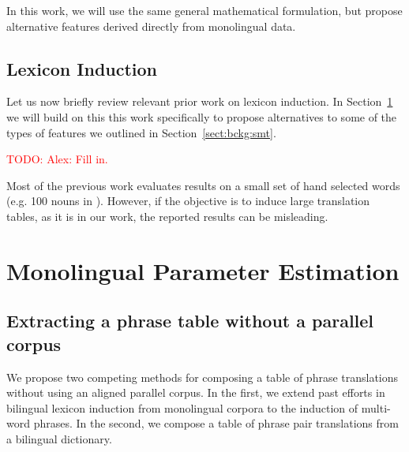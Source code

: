 \documentclass[11pt]{article}
\newcommand{\mnote}[1]{\marginpar{%
  \vskip-\baselineskip
  \raggedright\footnotesize
  \itshape\hrule\smallskip\tiny{#1}\par\smallskip\hrule}}
\newcommand{\mtodo}[1]{\mnote{\textcolor{red}{#1}}}
\newcommand{\todo}[1]{\textcolor{red}{TODO: #1}}
\newcommand{\secref}[1]{Section~\ref{#1}}
\begin{document}
In this work, we will use the same general mathematical formulation, but propose alternative features derived directly from monolingual data.

 \subsection{Lexicon Induction} \label{sect:bckg:lexind}
 
Let us now briefly review relevant prior work on lexicon induction.  In \secref{sect:mono} we will build on this this work specifically to propose alternatives to some of the types of features we outlined in \secref{sect:bckg:smt}.

\todo{Alex: Fill in.}

Most of the previous work evaluates results on a small set of hand selected words (e.g. 100 nouns in \cite{Rapp:1995}).  However, if the objective is to induce large translation tables, as it is in our work, the reported results can be misleading. \mtodo{Diss prev work, but make sure that it comes across that these features are informative.}
 

\section{Monolingual Parameter Estimation} \label{sect:mono}

\subsection{Extracting a phrase table without a parallel corpus}  \label{sect:extract}
We propose two competing methods for composing a table of phrase translations without using an aligned parallel corpus. In the first, we extend past efforts in bilingual lexicon induction from monolingual corpora to the induction of multi-word phrases. In the second, we compose a table of phrase pair translations from a bilingual dictionary.
\end{document}
